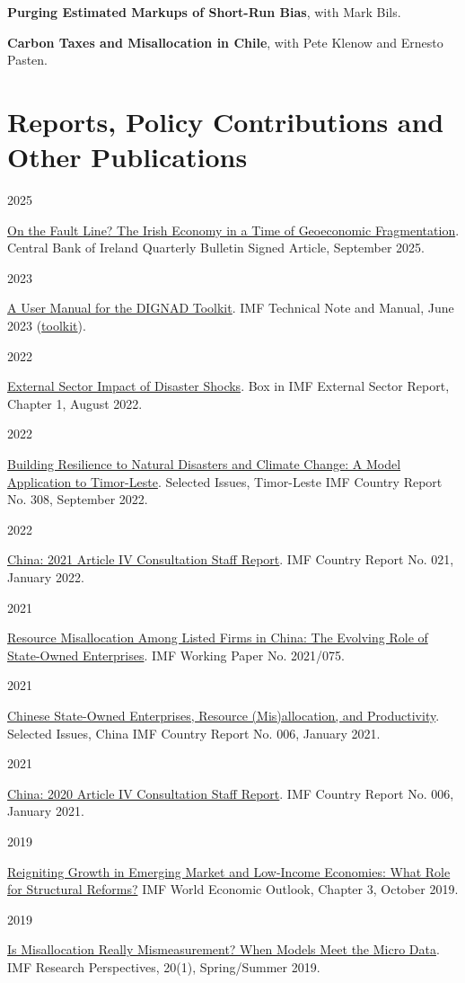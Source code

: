 \documentclass[10pt,a4paper]{article}
\let\oldsection\section
\renewcommand{\section}{\Needspace*{5\baselineskip}\oldsection}
\newlength{\yearw}\setlength{\yearw}{2.35cm}
\newcommand{\entry}[2]{%
  \par\noindent
  \begin{minipage}[t]{\yearw}\strut\color{grey}\small #1\end{minipage}%
  \hspace{0.25cm}%
  \begin{minipage}[t]{\dimexpr\textwidth-\yearw-0.25cm\relax}\strut #2\end{minipage}%
  \par\vspace{4pt}}
\newcommand{\paper}[3]{\par\noindent\begin{minipage}[t]{\textwidth}\textbf{#2}, #3\end{minipage}\par\vspace{6pt}}
\begin{document}
\paper{}{Purging Estimated Markups of Short-Run Bias}{with Mark Bils.}
\paper{}{Carbon Taxes and Misallocation in Chile}{with Pete Klenow and Ernesto Pasten.}

\section*{Reports, Policy Contributions and Other Publications}

\entry{2025}{\href{https://www.centralbank.ie/docs/default-source/publications/quarterly-bulletins/quarterly-bulletin-signed-articles/on-the-fault-line-irish-economy-in-a-time-of-geoeconomic-fragmentation.pdf}{On the Fault Line? The Irish Economy in a Time of Geoeconomic Fragmentation}. Central Bank of Ireland Quarterly Bulletin Signed Article, September 2025.}
\entry{2023}{\href{https://www.imf.org/en/Publications/TNM/Issues/2023/06/05/A-User-Manual-for-the-DIGNAD-Toolkit-531886}{A User Manual for the DIGNAD Toolkit}. IMF Technical Note and Manual, June 2023 (\href{https://climatedata.imf.org/pages/dignad}{toolkit}).}
\entry{2022}{\href{https://www.imf.org/en/Publications/ESR/Issues/2022/08/04/2022-external-sector-report}{External Sector Impact of Disaster Shocks}. Box in IMF External Sector Report, Chapter 1, August 2022.}
\entry{2022}{\href{https://www.imf.org/en/Publications/CR/Issues/2022/09/21/Democratic-Republic-of-Timor-Leste-Selected-Issues-523690}{Building Resilience to Natural Disasters and Climate Change: A Model Application to Timor-Leste}. Selected Issues, Timor-Leste IMF Country Report No. 308, September 2022.}
\entry{2022}{\href{https://www.imf.org/en/Publications/CR/Issues/2022/01/26/Peoples-Republic-of-China-2021-Article-IV-Consultation-Press-Release-Staff-Report-and-512248}{China: 2021 Article IV Consultation Staff Report}. IMF Country Report No. 021, January 2022.}
\entry{2021}{\href{https://www.imf.org/en/Publications/WP/Issues/2021/03/12/Resource-Misallocation-Among-Listed-Firms-in-China-The-Evolving-Role-of-State-Owned-50167}{Resource Misallocation Among Listed Firms in China: The Evolving Role of State-Owned Enterprises}. IMF Working Paper No. 2021/075.}
\entry{2021}{\href{https://www.imf.org/en/Publications/CR/Issues/2021/01/13/Peoples-Republic-of-China-Selected-Issues-50007}{Chinese State-Owned Enterprises, Resource (Mis)allocation, and Productivity}. Selected Issues, China IMF Country Report No. 006, January 2021.}
\entry{2021}{\href{https://www.imf.org/en/Publications/CR/Issues/2021/01/06/Peoples-Republic-of-China-2020-Article-IV-Consultation-Press-Release-Staff-Report-and-49992}{China: 2020 Article IV Consultation Staff Report}. IMF Country Report No. 006, January 2021.}
\entry{2019}{\href{https://www.imf.org/en/Publications/WEO/Issues/2019/10/01/world-economic-outlook-october-2019}{Reigniting Growth in Emerging Market and Low-Income Economies: What Role for Structural Reforms?} IMF World Economic Outlook, Chapter 3, October 2019.}
\entry{2019}{\href{https://www.imf.org/External/Pubs/FT/irb/2019/SpringSummer/index.pdf}{Is Misallocation Really Mismeasurement? When Models Meet the Micro Data}. IMF Research Perspectives, 20(1), Spring/Summer 2019.}
\end{document}
